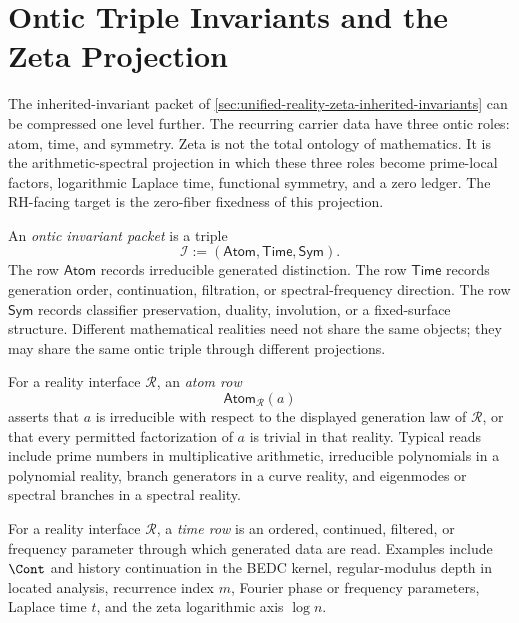 \section{Ontic Triple Invariants and the Zeta Projection}
\label{sec:unified-reality-zeta-ontic-projection}

The inherited-invariant packet of
\autoref{sec:unified-reality-zeta-inherited-invariants} can be compressed
one level further. The recurring carrier data have three ontic roles:
atom, time, and symmetry. Zeta is not the total ontology of mathematics.
It is the arithmetic-spectral projection in which these three roles
become prime-local factors, logarithmic Laplace time, functional
symmetry, and a zero ledger. The RH-facing target is the zero-fiber
fixedness of this projection.

\begin{definition}
\label{def:unified-reality-ontic-invariant-packet}
An \emph{ontic invariant packet} is a triple
$$
\mathcal I
:=
(\mathsf{Atom},\mathsf{Time},\mathsf{Sym}).
$$
The row $\mathsf{Atom}$ records irreducible generated distinction. The
row $\mathsf{Time}$ records generation order, continuation, filtration,
or spectral-frequency direction. The row $\mathsf{Sym}$ records
classifier preservation, duality, involution, or a fixed-surface
structure. Different mathematical realities need not share the same
objects; they may share the same ontic triple through different
projections.
\end{definition}

\begin{definition}
\label{def:unified-reality-ontic-atom-row}
For a reality interface $\mathcal R$, an \emph{atom row}
$$
\mathsf{Atom}_{\mathcal R}(a)
$$
asserts that $a$ is irreducible with respect to the displayed generation
law of $\mathcal R$, or that every permitted factorization of $a$ is
trivial in that reality. Typical reads include prime numbers in
multiplicative arithmetic, irreducible polynomials in a polynomial
reality, branch generators in a curve reality, and eigenmodes or
spectral branches in a spectral reality.
\end{definition}

\begin{definition}
\label{def:unified-reality-ontic-time-row}
For a reality interface $\mathcal R$, a \emph{time row} is an ordered,
continued, filtered, or frequency parameter through which generated data
are read. Examples include $\Cont$ and history continuation in the BEDC
kernel, regular-modulus depth in located analysis, recurrence index
$m$, Fourier phase or frequency parameters, Laplace time $t$, and the
zeta logarithmic axis $\log n$.
\end{definition}

